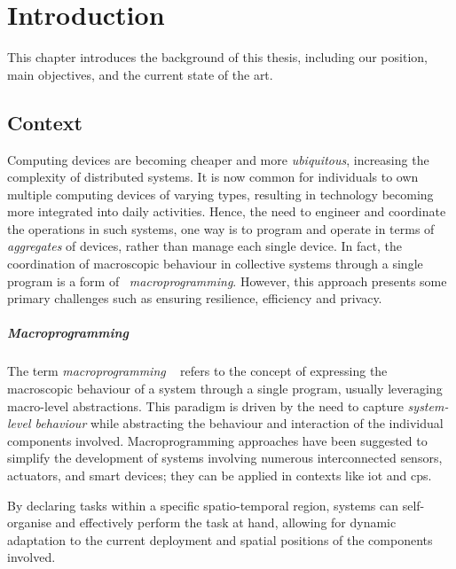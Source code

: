 
\chapter{Introduction}
\label{ch:introduction}
This chapter introduces the background of this thesis, including our position, main objectives,
and the current state of the art.

\section{Context}
\label{sec:context}

Computing devices are becoming cheaper and more \emph{ubiquitous}, increasing the complexity of distributed systems.
It is now common for individuals to own multiple computing devices of varying types,
resulting in technology becoming more integrated into daily activities.
Hence, the need to engineer and coordinate the operations in such systems, one way is to program and operate in terms of
    \emph{aggregates} of devices, rather than manage each single device.
In fact, the coordination of macroscopic behaviour in collective systems through a single program is a form of
~\emph{macroprogramming}.
However, this approach presents some primary challenges such as ensuring resilience, efficiency and privacy.

\paragraph{Macroprogramming}
The term \emph{macroprogramming} ~\cite{10.1145/3579353} refers to the concept of expressing the macroscopic behaviour of a system through a single
program, usually leveraging macro-level abstractions.
This paradigm is driven by the need to capture \emph{system-level behaviour} while abstracting the behaviour and interaction
of the individual components involved.
Macroprogramming approaches have been suggested to simplify the development of systems involving numerous interconnected
sensors, actuators, and smart devices; they can be applied in contexts like \ac{iot} and \ac{cps}.

By declaring tasks within a specific spatio-temporal region, systems can self-organise and effectively perform the task
at hand, allowing for dynamic adaptation to the current deployment and spatial positions of the components involved.


